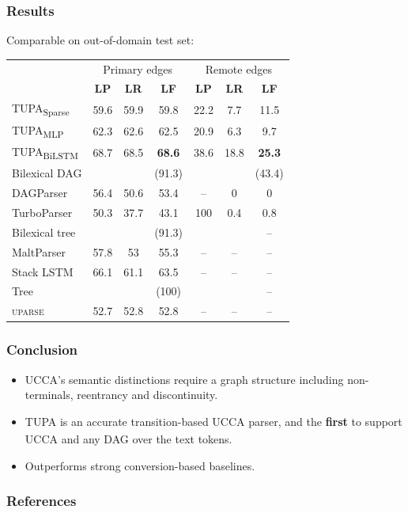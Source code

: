 \documentclass[t,xcolor={svgnames}]{beamer}
\newcommand{\parser}[1]{TUPA\textsubscript{#1}}
\begin{document}
\begin{frame}
\frametitle{Results}
Comparable on out-of-domain test set:
\begin{center}
	\begin{tabular}{l|ccc|ccc}
		& \multicolumn{3}{c|}{Primary edges} & \multicolumn{3}{c}{Remote edges} \\
		& \textbf{LP} & \textbf{LR} & \textbf{LF} & \textbf{LP} & \textbf{LR} & \textbf{LF} \\
		\hline
		\parser{Sparse}
		& 59.6 & 59.9 & 59.8 & 22.2 & 7.7 & 11.5 \\
		\parser{MLP}
		& 62.3 & 62.6 & 62.5 & 20.9 & 6.3 & 9.7 \\
		\parser{BiLSTM}
		& 68.7 & 68.5 & \textbf{68.6} & 38.6 & 18.8 & \textbf{25.3} \\
		\hline
		\scriptsize Bilexical DAG
		& & & \scriptsize (91.3) & & & \scriptsize (43.4) \\
		DAGParser
		& 56.4 & 50.6 & 53.4 & -- & 0 & 0 \\
		TurboParser
		& 50.3 & 37.7 & 43.1 & 100 & 0.4 & 0.8 \\
		\hline
		\scriptsize Bilexical tree
		& & & \scriptsize (91.3) & & & \scriptsize -- \\
		MaltParser
		& 57.8 & 53 & 55.3 & -- & -- & -- \\
		Stack LSTM
		& 66.1 & 61.1 & 63.5 & -- & -- & -- \\
		\hline
		\scriptsize Tree
		& & & \scriptsize (100) & & & \scriptsize -- \\
		\textsc{uparse}
		& 52.7 & 52.8 & 52.8 & -- & -- & --
	\end{tabular}
\end{center}
\end{frame}



\begin{frame}
\frametitle{Conclusion}
\begin{itemize}
 \item UCCA's semantic distinctions require a graph structure including {\color{blue}non-terminals}, {\color{orange}reentrancy} and {\color{red}discontinuity}.
 \item \parser{} is an accurate transition-based UCCA parser,
 	and the \textbf{first} to support UCCA and any DAG over the text tokens.
 \item Outperforms strong conversion-based baselines.
\end{itemize}

\end{frame}



\begin{frame}[allowframebreaks]
\frametitle{References}

\tiny
\end{frame}
\end{document}
